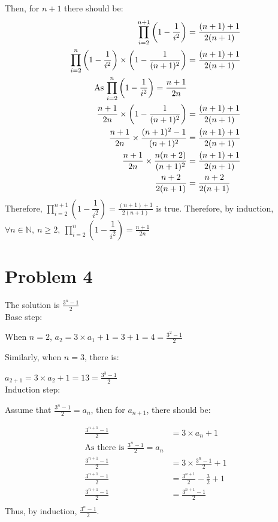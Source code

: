 \documentclass{article}
\begin{document}
    Then, for \(n+1\) there should be:
    \begin{align*}
        \prod ^{n+1}_{i=2}\left(1-\dfrac{1}{i^2}\right)&= \frac{(n+1)+1}{2(n+1)}\\
        \prod ^{n}_{i=2}\left(1-\dfrac{1}{i^2}\right)\times \left(1-\frac{1}{(n+1)^2}\right)&= \frac{(n+1)+1}{2(n+1)}\\
        \text{As  \( \prod ^n_{i=2}\left(1-\dfrac{1}{i^2}\right)=\frac{n+1}{2n}\)}\\
        \frac{n+1}{2n} \times \left(1-\frac{1}{(n+1)^2}\right)&=\frac{(n+1)+1}{2(n+1)}\\
        \frac{n+1}{2n}\times \frac{(n+1)^2-1}{(n+1)^2}&= \frac{(n+1)+1}{2(n+1)}\\
        \frac{n+1}{2n}\times \frac{n(n+2)}{(n+1)^2}&= \frac{(n+1)+1}{2(n+1)}\\
        \frac{n+2}{2(n+1)} &= \frac{n+2}{2(n+1)}
    \end{align*}    
    Therefore, \(\displaystyle{\prod ^{n+1}_{i=2}\left(1-\dfrac{1}{i^2}\right) = \frac{(n+1)+1}{2(n+1)}}\) is true.
    Therefore, by induction, \(\forall n\in \mathbb{N},\ n\geqslant2,\ \displaystyle {\prod ^n_{i=2}\left(1-\dfrac{1}{i^2}\right)=\frac{n+1}{2n}}\)
\newpage
\section*{Problem 4}
    The solution is \(\displaystyle{\frac{3^n-1}{2}}\)\\
    Base step:

    When \(n=2\), \(a_2=3\times a_1+1=3+1=4=\displaystyle{\frac{3^2-1}{2}}\)
    
    Similarly, when \(n=3\), there is:

    \(a_{2+1}=3\times a_2+1=13 = \displaystyle {\frac{3^3-1}{2}}\)
    \\
    Induction step:

    Assume that \(\displaystyle{\frac{3^n-1}{2}}=a_n\), then for   \(a_{n+1}\), there should be:


    \begin{align*}
        \frac{3^{n+1}-1}{2}&=3\times a_n+1\\
        \text{As there is \(\frac{3^n-1}{2}=a_n\)}\\
        \frac{3^{n+1}-1}{2}&=3\times \frac{3^n-1}{2}+1\\
        \frac{3^{n+1}-1}{2}&=\frac{3^{n+1}}{2}-\frac{3}{2}+1\\
        \frac{3^{n+1}-1}{2}&=\frac{3^{n+1}-1}{2}\\
    \end{align*}
    Thus, by induction, \(\displaystyle{\frac{3^n-1}{2}}\).
\end{document}
